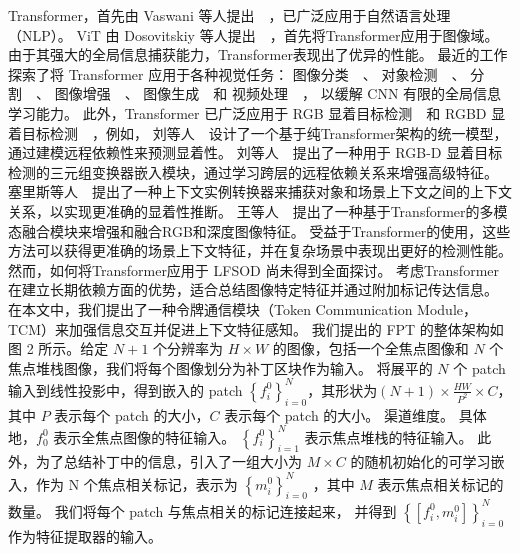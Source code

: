 Transformer，首先由 Vaswani 等人提出~\cite{vaswani2017attention}~，已广泛应用于自然语言处理（NLP）。
ViT 由 Dosovitskiy 等人提出~\cite{dosovitskiy2020image}~，首先将Transformer应用于图像域。 由于其强大的全局信息捕获能力，Transformer表现出了优异的性能。
最近的工作探索了将 Transformer 应用于各种视觉任务：
图像分类~\cite{chen2020generative, dosovitskiy2020image}~、
对象检测~\cite{zhu2020deformable, dai2021up, sun2021rethinking}~、
分割~\cite{chen2021pre, wang2021end}~、
图像增强~\cite{yang2020learning, chen2021pre}~、
图像生成~\cite{parmar2018image}~和 
视频处理~\cite{zhou2018end, zheng2020end}~，
以缓解 CNN 有限的全局信息学习能力。 此外，Transformer 已广泛应用于 RGB 显着目标检测~\cite{liu2021visual, siris2021scene}~和 RGBD 显着目标检测~\cite{liu2021tritransnet, wang2021mutualformer}~，例如，
刘等人~\cite{liu2021visual}~设计了一个基于纯Transformer架构的统一模型，通过建模远程依赖性来预测显着性。 
刘等人~\cite{liu2021tritransnet}~提出了一种用于 RGB-D 显着目标检测的三元组变换器嵌入模块，通过学习跨层的远程依赖关系来增强高级特征。 
塞里斯等人~\cite{siris2021scene}~提出了一种上下文实例转换器来捕获对象和场景上下文之间的上下文关系，以实现更准确的显着性推断。 
王等人~\cite{wang2021mutualformer}~提出了一种基于Transformer的多模态融合模块来增强和融合RGB和深度图像特征。
受益于Transformer的使用，这些方法可以获得更准确的场景上下文特征，并在复杂场景中表现出更好的检测性能。 然而，如何将Transformer应用于 LFSOD 尚未得到全面探讨。 考虑Transformer在建立长期依赖方面的优势，适合总结图像特定特征并通过附加标记传达信息。 在本文中，我们提出了一种令牌通信模块（Token Communication
Module，TCM）来加强信息交互并促进上下文特征感知。
%
%
%
%
%
%
%
%
我们提出的 FPT 的整体架构如图 2 所示。给定 $N + 1$ 个分辨率为 $ H \times W $ 的图像，包括一个全焦点图像和 $N$ 个焦点堆栈图像，我们将每个图像划分为补丁区块作为输入。 
将展平的 $N$ 个 patch 输入到线性投影中，得到嵌入的 patch $ \left \{ f_{i}^{0} \right \}_{i=0}^{N} $，其形状为$ \left ( N + 1 \right ) \times \frac{HW}{P^{2}} \times C  $，其中 $P$ 表示每个 patch 的大小，$C$ 表示每个 patch 的大小。 
渠道维度。 
%
%
%
%
具体地，$ f_{0}^{0} $ 表示全焦点图像的特征输入。 
$ \left \{ f_{i}^{0} \right \}_{i=1}^{N} $ 表示焦点堆栈的特征输入。 
此外，为了总结补丁中的信息，引入了一组大小为 $ M \times C $ 的随机初始化的可学习嵌入，作为 { }N 个焦点相关标记，表示为 $ \left \{ m_{i}^{0} \right \}_{i=0}^{N} $ ，其中 $M$ 表示焦点相关标记的数量。 
我们将每个 patch 与焦点相关的标记连接起来，
并得到 $ \left \{ \left [ f_{i}^{0},m_{i}^{0}  \right ]  \right \}_{i=0}^{N} $ 作为特征提取器的输入。 
%
%
%
%
%
\par
